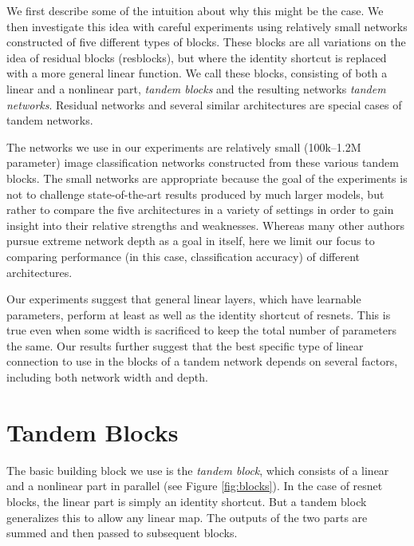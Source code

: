 \documentclass{article} %
\begin{document}
We first describe some of the intuition about why this might be the case.  We then investigate this idea with careful experiments using relatively small networks constructed of five different types of  blocks.  These blocks are all variations on the idea of residual blocks (resblocks), but where the identity shortcut is replaced with a more general linear function. We call these blocks, consisting of both a linear and a nonlinear part, \emph{tandem blocks} and the resulting networks \emph{tandem networks}. Residual networks and several similar architectures are special cases of tandem networks.

The networks we use in our experiments are relatively small  (100k--1.2M parameter) image classification networks constructed from these various tandem blocks.  The small networks are appropriate because the goal of the experiments is not to challenge state-of-the-art results produced by much larger models, but rather to compare the five architectures in a variety of settings in order to gain insight into their relative strengths and weaknesses. Whereas many other authors pursue extreme network depth as a goal in itself, here we limit our focus to comparing performance (in this case, classification accuracy) of different architectures. 

Our experiments suggest that general linear layers, which have learnable parameters, perform at least as well as the identity shortcut of resnets. This is true even when some width is sacrificed to keep the total number of parameters the same. Our results further suggest that the best specific type of linear connection to use in the blocks of a tandem network depends on several factors, including both network width and depth.


\section{Tandem Blocks}
\label{linear}

The basic building block we use is the \emph{tandem block}, which consists of a linear and a nonlinear part in parallel (see Figure \ref{fig:blocks}). In the case of resnet blocks, the linear part is simply an identity shortcut. But a tandem block generalizes this to allow any linear map. The outputs of the two parts are summed and then passed to subsequent blocks.  
\end{document}
